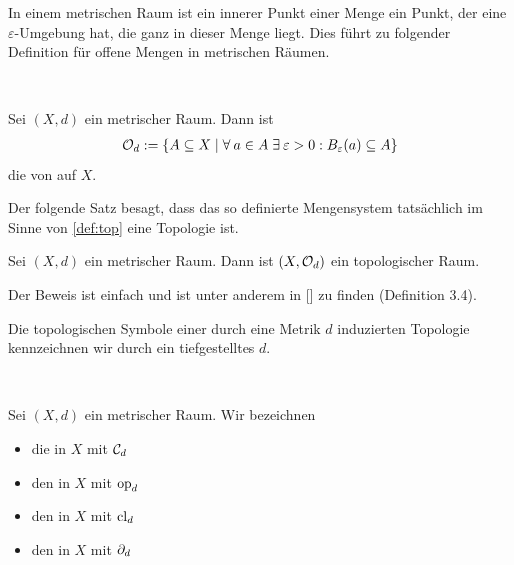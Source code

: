    In
    einem metrischen Raum ist ein innerer Punkt einer Menge ein Punkt, der eine $\varepsilon$-Umgebung hat, die ganz in dieser Menge liegt. Dies führt zu folgender Definition für offene Mengen in metrischen Räumen.
    \begin{dfn} \label{def:topMet} \ \vspace{8pt}

        \noindent
        Sei $(X,d)$ ein metrischer Raum. Dann ist
        \begin{align*}
            \mathcal{O}_d := \{A \subseteq X \mid \forall\: a \in A \; \exists\: \varepsilon > 0: B_\varepsilon(a) \subseteq A \}
        \end{align*}
        die von  auf $X$.
        
    \end{dfn}

    Der folgende Satz besagt, dass das so definierte Mengensystem tatsächlich im Sinne von \ref{def:top} eine Topologie ist.
    \begin{satz}
        Sei $(X,d)$ ein metrischer Raum. Dann ist $(X,\mathcal{O}_d)$ ein topologischer Raum.
    \end{satz}
    Der Beweis ist einfach und ist unter anderem in [\cite{manetti-m-2015--a}] zu finden (Definition 3.4).

    Die topologischen Symbole einer durch eine Metrik $d$ induzierten Topologie kennzeichnen wir durch ein tiefgestelltes $d$.
    \begin{nota} \ \vspace{8pt}

        \noindent
        Sei $(X,d)$ ein metrischer Raum. Wir bezeichnen 
        \begin{itemize}
        \item die  in $X$ mit $\mathcal{C}_d$
        \item den  in $X$ mit $\text{op}_d$
        \item den  in $X$ mit $\text{cl}_d$
        \item den  in $X$ mit $\partial_d$
        \end{itemize}
    \end{nota}


